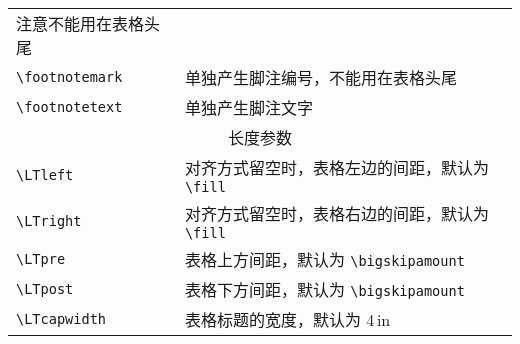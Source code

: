 \begin{longtable}{|l|l|}
  注意不能用在表格头尾 \\
\verb=\footnotemark= & 单独产生脚注编号，不能用在表格头尾 \\
\verb=\footnotetext= & 单独产生脚注文字 \\
\hline \multicolumn{2}{|c|}{长度参数} \\ \hline
\verb=\LTleft= & 对齐方式留空时，表格左边的间距，默认为 \verb=\fill=\\
\verb=\LTright= & 对齐方式留空时，表格右边的间距，默认为 \verb=\fill=\\
\verb=\LTpre= & 表格上方间距，默认为 \verb=\bigskipamount= \\
\verb=\LTpost= & 表格下方间距，默认为 \verb=\bigskipamount= \\
\verb=\LTcapwidth= & 表格标题的宽度，默认为 4\,in \\
\end{longtable}
